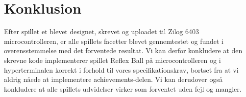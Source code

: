 \newpage
\chapter{Konklusion}
Efter spillet et blevet designet, skrevet og uploadet til Zilog 6403 microcontrolleren, er alle spillets facetter blevet gennemtestet og fundet i overensstemmelse med det forventede resultat. Vi kan derfor konkludere at den skrevne kode implementerer spillet Reflex Ball på microcontrolleren og i hyperterminalen korrekt i forhold til vores specifikationskrav, bortset fra at vi aldrig nåede at implementere achievements-delen. Vi kan derudover også konkludere at alle spillets udvidelser virker som forventet uden fejl og mangler. \\

